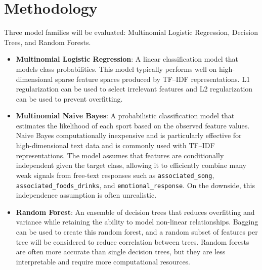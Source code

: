 \documentclass[12pt]{article}
\begin{document}
\section{Methodology}\label{sec:methodology}
Three model families will be evaluated: Multinomial Logistic Regression, Decision Trees, and Random Forests.
\begin{itemize} 
    \item \textbf{Multinomial Logistic Regression}: A linear classification model that models class probabilities. This model typically performs well on high-dimensional sparse feature spaces produced by TF--IDF representations. L1 regularization can be used to select irrelevant features and L2 regularization can be used to prevent overfitting.
    \item \textbf{Multinomial Naive Bayes}: A probabilistic classification model that estimates the likelihood of each sport based on the observed feature values. Naive Bayes computationally inexpensive and is particularly effective for high-dimensional text data and is commonly used with TF--IDF representations. The model assumes that features are conditionally independent given the target class, allowing it to efficiently combine many weak signals from free-text responses such as \texttt{associated\_song}, \texttt{associated\_foods\_drinks}, and \texttt{emotional\_response}. On the downside, this independence assumption is often unrealistic.
    \item \textbf{Random Forest}: An ensemble of decision trees that reduces overfitting and variance while retaining the ability to model non-linear relationships. Bagging can be used to create this random forest, and a random subset of features per tree will be considered to reduce correlation between trees. Random forests are often more accurate than single decision trees, but they are less interpretable and require more computational resources.
\end{itemize} 
\end{document}
